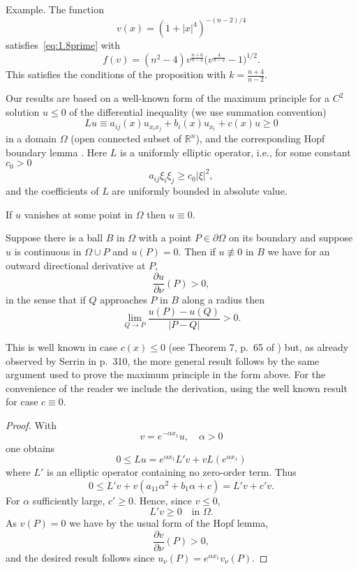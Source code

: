 Example. The function
\[v(x) = (1+|x|^4)^{-(n-2)/4}\]
satisfies~\eqref{eq:1.8prime} with
\[f(v) = (n^2-4) v^{\frac{n+6}{n-2}} \biggl(v^{\frac{4}{n-2}}-1\biggr)^{1/2}.\]
This satisfies the conditions of the proposition with $k = \frac{n+4}{n-2}$.

Our results are based on a well-known form of the maximum principle \cite{protter_maximum_1984} for
a $C^2$ solution $u\leq 0$ of the differential inequality (we use summation convention)
\begin{equation}\label{eq:1.10}
  Lu\equiv a_{ij}(x)u_{x_ix_j} + b_i(x)u_{x_i} + c(x)u \geq 0
\end{equation}
in a domain $\Omega$ (open connected subset of $\mathbb{R}^n$),
and the corresponding Hopf boundary lemma \cite{protter_maximum_1984}. 
Here $L$ is a uniformly elliptic operator, i.e., for some constant $c_0>0$
\begin{equation}\label{eq:1.11}
  a_{ij}\xi_i\xi_j \geq c_0|\xi|^2,
\end{equation}
and the coefficients of $L$ are uniformly bounded in absolute value.

\begin{MP}
If $u$ vanishes at some point in $\Omega$ then $u\equiv 0$.
\end{MP}

\begin{lemma}
  Suppose there is a ball $B$ in $\Omega$ with a point $P\in\partial\Omega$
  on its boundary and suppose $u$ is continuous in $\Omega\cup P$ and $u(P)=0$.
  Then if $u\not\equiv 0$ in $B$ we have for an outward directional derivative at $P$,
  \[\frac{\partial u}{\partial \nu}(P) > 0,\]
  in the sense that if $Q$ approaches $P$ in $B$ along a radius then
  \[\lim_{Q\to P} \frac{u(P)-u(Q)}{|P-Q|} > 0.\]
\end{lemma}

This is well known in case $c(x)\leq 0$ (see Theorem 7, p.~65 of \cite{protter_maximum_1984}) but,
as already observed by Serrin in \cite{serrin_symmetry_1971} p.~310, the more general result follows by the same
argument used to prove the maximum principle in the form above.
For the convenience of the reader we include the derivation, using the well known
result for case $c\equiv 0$.

\begin{proof}
  With
  \[v = e^{-\alpha x_1} u, \quad \alpha>0\]
  one obtains
  \[0\leq Lu = e^{\alpha x_1} L'v + vL(e^{\alpha x_1})\]
  where $L'$ is an elliptic operator containing no zero-order term. Thus
  \[0\leq L'v + v(a_{11}\alpha^2 + b_1\alpha +c) = L'v + c'v.\]
  For $\alpha$ sufficiently large, $c'\geq 0$. Hence, since $v\leq 0$,
  \[L'v \geq 0\quad \text{in } \Omega.\]
  As $v(P)=0$ we have by the usual form of the Hopf lemma,
  \[\frac{\partial v}{\partial \nu}(P)>0,\]
  and the desired result follows since $u_{\nu}(P) = e^{\alpha x_1} v_{\nu}(P)$.
\end{proof}

